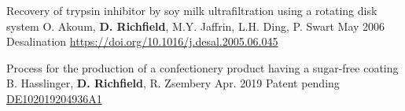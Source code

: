 \documentclass[%
               doublesided,
               paper=a4,
               fontsize=10pt
              ]{my-resume}
\begin{document}
{\publication
	{Recovery of trypsin inhibitor by soy milk ultrafiltration using a rotating disk system} %
	{O. Akoum, \textbf{D. Richfield}, M.Y. Jaffrin, L.H. Ding, P. Swart } %
	{May 2006} %
	{Desalination} %
	{\href{https://doi.org/10.1016/j.desal.2005.06.045}{https://doi.org/10.1016/j.desal.2005.06.045}} %

\publication
	{Process for the production of a confectionery product having a sugar-free \mbox{coating}} %
	{B. Hasslinger, \textbf{D. Richfield}, R. Zsembery} %
	{Apr. 2019} %
	{Patent pending} %
	{\href{https://patents.google.com/patent/DE102019204936A1}{DE102019204936A1}} %

}
\makebody


\clearpage
\end{document}
